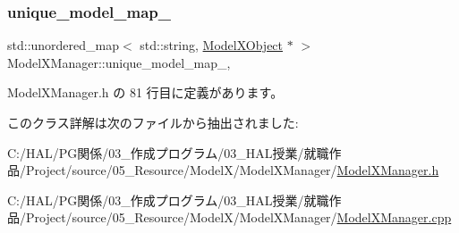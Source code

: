 \subsubsection{\texorpdfstring{unique\+\_\+model\+\_\+map\+\_\+}{unique\_model\_map\_}}
{\footnotesize\ttfamily std\+::unordered\+\_\+map$<$ std\+::string, \mbox{\hyperlink{class_model_x_object}{Model\+X\+Object}} $\ast$ $>$ Model\+X\+Manager\+::unique\+\_\+model\+\_\+map\+\_\+\hspace{0.3cm}{\ttfamily [static]}, {\ttfamily [private]}}



 Model\+X\+Manager.\+h の 81 行目に定義があります。



このクラス詳解は次のファイルから抽出されました\+:\begin{DoxyCompactItemize}
\item 
C\+:/\+H\+A\+L/\+P\+G関係/03\+\_\+作成プログラム/03\+\_\+\+H\+A\+L授業/就職作品/\+Project/source/05\+\_\+\+Resource/\+Model\+X/\+Model\+X\+Manager/\mbox{\hyperlink{_model_x_manager_8h}{Model\+X\+Manager.\+h}}\item 
C\+:/\+H\+A\+L/\+P\+G関係/03\+\_\+作成プログラム/03\+\_\+\+H\+A\+L授業/就職作品/\+Project/source/05\+\_\+\+Resource/\+Model\+X/\+Model\+X\+Manager/\mbox{\hyperlink{_model_x_manager_8cpp}{Model\+X\+Manager.\+cpp}}\end{DoxyCompactItemize}
